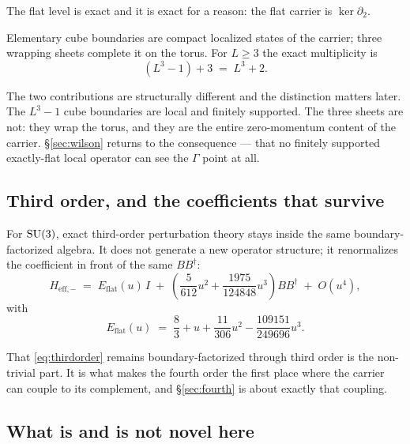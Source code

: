 The flat level is exact and it is exact for a reason: the flat carrier
is $\ker \partial_2$.

\begin{theorem}
\label{thm:multiplicity}
Elementary cube boundaries are compact localized states of the carrier;
three wrapping sheets complete it on the torus. For $L \ge 3$ the exact
multiplicity is
\begin{equation}
  (L^3 - 1) + 3 \;=\; L^3 + 2 .
\end{equation}
\end{theorem}

The two contributions are structurally different and the distinction
matters later. The $L^3 - 1$ cube boundaries are local and finitely
supported. The three sheets are not: they wrap the torus, and they are
the entire zero-momentum content of the carrier. \S\ref{sec:wilson}
returns to the consequence --- that no finitely supported exactly-flat
local operator can see the $\Gamma$ point at all.

\subsection{Third order, and the coefficients that survive}

For $\mathrm{SU}(3)$, exact third-order perturbation theory stays inside the
same boundary-factorized algebra. It does not generate a new operator
structure; it renormalizes the coefficient in front of the same
$BB^{\dagger}$:
\begin{equation}
  H_{\mathrm{eff},-}
  \;=\; E_{\mathrm{flat}}(u)\, I
  \;+\; \left(\frac{5}{612}u^2 + \frac{1975}{124848}u^3\right) BB^{\dagger}
  \;+\; O(u^4),
  \label{eq:thirdorder}
\end{equation}
with
\begin{equation}
  E_{\mathrm{flat}}(u)
  \;=\; \frac{8}{3} + u + \frac{11}{306}u^2
        - \frac{109151}{249696}u^3 .
\end{equation}

That \eqref{eq:thirdorder} remains boundary-factorized through third
order is the non-trivial part. It is what makes the fourth order the
first place where the carrier can couple to its complement, and
\S\ref{sec:fourth} is about exactly that coupling.

\subsection{What is and is not novel here}

